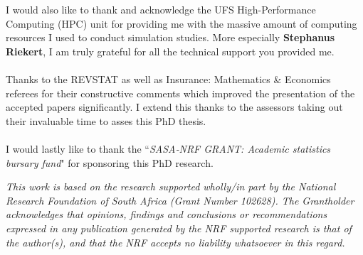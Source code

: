 I would also like to thank and acknowledge the UFS High-Performance Computing (HPC) unit for providing me with the massive amount of computing resources I used to conduct simulation studies. More especially \textbf{Stephanus Riekert}, I am truly grateful for all the technical support you provided me.
\\\\
Thanks to the REVSTAT as well as Insurance: Mathematics \& Economics referees for their constructive comments which improved the presentation of the accepted papers significantly. I extend this thanks to the assessors taking out their invaluable time to asses this PhD thesis.
\\\\
I would lastly like to thank the ``\textit{SASA‐NRF GRANT: Academic statistics bursary fund}" for sponsoring this PhD research.

\textit{This work is based on the research supported wholly/in part by the National Research Foundation of South Africa (Grant Number 102628). The Grantholder acknowledges that opinions, findings and conclusions or recommendations expressed in any publication generated by the NRF supported research is that of the author(s), and that the NRF accepts no liability whatsoever in this regard.}\newpage
\cleardoublepage
